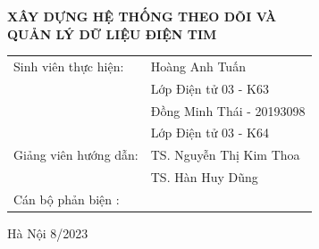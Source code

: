   \begin{center}
     \textbf{\fontsize{20pt}{0pt}\selectfont XÂY DỰNG HỆ THỐNG THEO DÕI VÀ } \\
     \textbf{\fontsize{20pt}{0pt}\selectfont QUẢN LÝ DỮ LIỆU ĐIỆN TIM }
  
  \vspace{1.5cm}
  \begin{table}[H]
       \centering
       \begin{tabular}{l l}
            \fontsize{14pt}{0pt}\selectfont Sinh viên thực hiện:      & \fontsize{14pt}{0pt}\selectfont Hoàng Anh Tuấn \\
            &\fontsize{14pt}{0pt}\selectfont Lớp Điện tử 03 - K63 \vspace{6pt} \\
            &\fontsize{14pt}{0pt}\selectfont Đồng Minh Thái - 20193098  \\
            &\fontsize{14pt}{0pt}\selectfont Lớp Điện tử 03 - K64 \vspace{6pt} \\
            \fontsize{14pt}{0pt}\selectfont Giảng viên hướng dẫn: & \fontsize{14pt}{0pt}\selectfont TS. Nguyễn Thị Kim Thoa  \vspace{6pt} \\  
              &\fontsize{14pt}{0pt}\selectfont TS. Hàn Huy Dũng \vspace{6pt} \\
            Cán bộ phản biện : &
       \end{tabular}
  \end{table}
  \vspace{0.4cm} %
  \fontsize{14pt}{0pt}\selectfont Hà Nội 8/2023
  \end{center}
  
  \cleardoublepage %
  